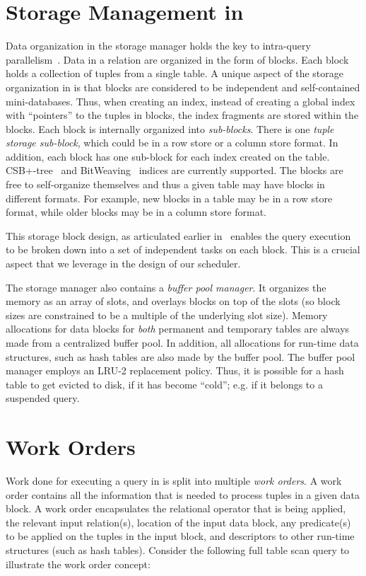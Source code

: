 \section{Storage Management in \sys{}}\label{sec:storage-manager}
Data organization in the \sys{} storage manager holds the key to intra-query 
parallelism~\cite{quickstep-storage}. 
Data in a relation are organized in the form of blocks. 
Each block holds a collection of tuples from a single table. 
A unique aspect of the storage organization in \sys{} is that blocks are considered to 
be independent and self-contained mini-databases. 
Thus, when creating an index, instead of creating a global index with 
``pointers'' to the tuples in blocks, the index fragments are stored within the blocks. 
Each block is internally organized into \textit{sub-blocks}. 
There is one \textit{tuple storage sub-block}, which could be in a row store or a 
column store format.
In addition, each block has one sub-block for each index created on the table. 
CSB+-tree~\cite{csb+-tree} and BitWeaving~\cite{bitweaving} 
indices are currently supported. 
The blocks are free to self-organize themselves and thus a given table may have blocks in different formats. 
For example, new blocks in a table may be in a row store format, while older blocks may 
be in a column store format.

This storage block design, as articulated earlier in~\cite{quickstep-storage} enables the query execution to be broken down into a set of independent tasks on each block. 
This is a crucial aspect that we leverage in the design of our scheduler. 

The storage manager also contains a \textit{buffer pool manager}. 
It organizes the memory as an array of slots, and overlays blocks on top of the slots (so block sizes are constrained to be a multiple of the underlying slot size). 
Memory allocations for data blocks for \textit{both} permanent and temporary tables are always made from a centralized buffer pool. 
In addition, all allocations for run-time data structures, such as hash tables are also made 
by the buffer pool. 
The buffer pool manager employs an LRU-2 replacement policy. 
Thus, it is possible for a hash table to get evicted to disk, if it has become ``cold''; e.g. if it belongs to a suspended query.

\section{Work Orders}\label{sec:workorders}
Work done for executing a query in \sys{} is split into multiple \textit{work 
	orders}. %
A work order contains all the information that is needed to process tuples in a given 
data block. 
A work order encapsulates the relational operator that is being applied, the relevant 
input relation(s), location of the input data block, any predicate(s) to be 
applied on the tuples in the input block, and descriptors to other run-time 
structures (such as hash tables).
Consider the following full table scan query to illustrate the work order concept:


